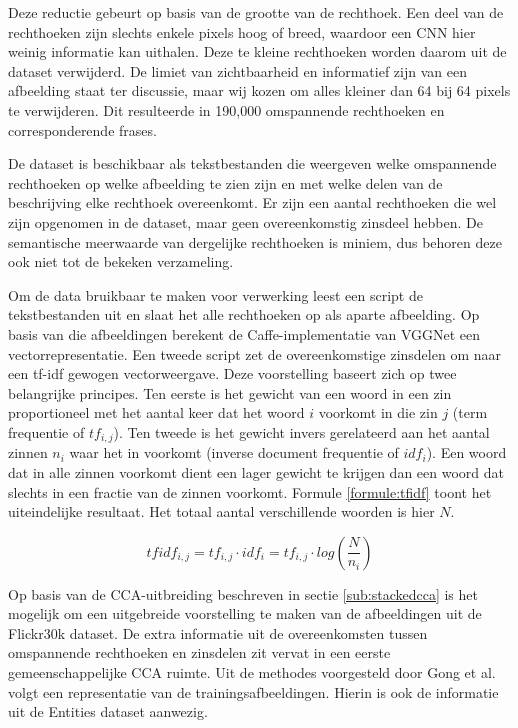 Deze reductie gebeurt op basis van de grootte van de rechthoek. Een deel van de rechthoeken zijn slechts enkele pixels hoog of breed, waardoor een CNN hier weinig informatie kan uithalen. Deze te kleine rechthoeken worden daarom uit de dataset verwijderd. De limiet van zichtbaarheid en informatief zijn van een afbeelding staat ter discussie, maar wij kozen om alles kleiner dan 64 bij 64 pixels te verwijderen. Dit resulteerde in 190,000 omspannende rechthoeken en corresponderende frases. 

De dataset is beschikbaar als tekstbestanden die weergeven welke omspannende rechthoeken op welke afbeelding te zien zijn en met welke delen van de beschrijving elke rechthoek overeenkomt. Er zijn een aantal rechthoeken die wel zijn opgenomen in de dataset, maar geen overeenkomstig zinsdeel hebben. De semantische meerwaarde van dergelijke rechthoeken is miniem, dus behoren deze ook niet tot de bekeken verzameling. 

Om de data bruikbaar te maken voor verwerking leest een script de tekstbestanden uit en slaat het alle rechthoeken op als aparte afbeelding. Op basis van die afbeeldingen berekent de Caffe-implementatie van VGGNet een vectorrepresentatie. Een tweede script zet de overeenkomstige zinsdelen om naar een tf-idf gewogen vectorweergave. Deze voorstelling baseert zich op twee belangrijke principes. Ten eerste is het gewicht van een woord in een zin proportioneel met het aantal keer dat het woord $i$ voorkomt in die zin $j$ (term frequentie of $tf_{i,j}$). Ten tweede is het gewicht invers gerelateerd aan het aantal zinnen $n_i$ waar het in voorkomt (inverse document frequentie of $idf_i$). Een woord dat in alle zinnen voorkomt dient een lager gewicht te krijgen dan een woord dat slechts in een fractie van de zinnen voorkomt. Formule \eqref{formule:tfidf} toont het uiteindelijke resultaat. Het totaal aantal verschillende woorden is hier $N$\cite{Jurafsky:2009:SLP:1214993}. 

\begin{equation}
\label{formule:tfidf}
	tfidf_{i,j} = tf_{i,j}\cdot{idf_{i}} = tf_{i,j}\cdot{log(\frac{N}{n_i})}
\end{equation}

Op basis van de CCA-uitbreiding beschreven in sectie \ref{sub:stackedcca} is het mogelijk om een uitgebreide voorstelling te maken van de afbeeldingen uit de Flickr30k dataset. De extra informatie uit de overeenkomsten tussen omspannende rechthoeken en zinsdelen zit vervat in een eerste gemeenschappelijke CCA ruimte. Uit de methodes voorgesteld door Gong et al.\cite{Gong2014} volgt een representatie van de trainingsafbeeldingen. Hierin is ook de informatie uit de Entities dataset aanwezig.

